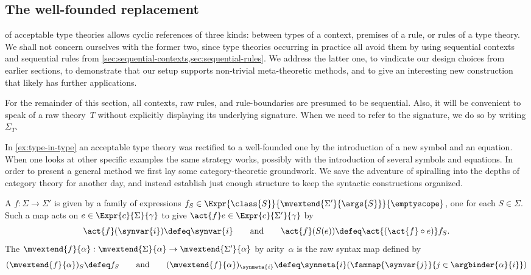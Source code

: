 
\subsection{The well-founded replacement}
\label{sec:well-founded-replacement}

 of acceptable type theories allows cyclic references of three kinds: between types of a context, premises of a rule, or rules of a type theory.
%
We shall not concern ourselves with the former two, since type theories occurring in practice all avoid them by using sequential contexts and sequential rules from \cref{sec:sequential-contexts,sec:sequential-rules}. We address the latter one, to
vindicate our design choices from earlier sections, to demonstrate that our setup supports non-trivial meta-theoretic methods, and to give an interesting new construction that likely has further applications.

For the remainder of this section, all contexts, raw rules, and rule-boundaries are presumed to be sequential. Also, it will be convenient to speak of a raw theory~$T$ without explicitly displaying its underlying signature. When we need to refer to the signature, we do so by writing $\Sigma_T$.

In \cref{ex:type-in-type} an acceptable type theory was rectified to a well-founded one by the introduction of a new symbol and an equation. When one looks at other specific examples the same strategy works, possibly with the introduction of several symbols and equations.
%
In order to present a general method we first lay some category-theoretic groundwork. We save the adventure of spiralling into the depths of category theory for another day, and instead establish just enough structure to keep the syntactic constructions organized.

\begin{definition}
  \label{def:raw-syntax-map}%
  A  $f : \Sigma \to \Sigma'$ is given by a family of expressions
  $f_S \in \Expr{\class{S}}{\mvextend{\Sigma'}{\args{S}}}{\emptyscope}$, one for each
  $S \in \Sigma$.
  Such a map acts on $e \in \Expr{c}{\Sigma}{\gamma}$ to give $\act{f} e \in \Expr{c}{\Sigma'}{\gamma}$ by
  \begin{equation}
    \label{eq:raw-syntax-map}%
    \act{f} (\synvar{i}) \defeq \synvar{i}
    \qquad\text{and}\qquad
    \act{f} (S(e)) \defeq \act{(\act{f} \circ e)} f_S.
  \end{equation}
  The  $\mvextend{f}{\alpha} : \mvextend{\Sigma}{\alpha} \to \mvextend{\Sigma'}{\alpha}$ by arity~$\alpha$ is the raw syntax map defined by
  \begin{equation*}
    (\mvextend{f}{\alpha})_S \defeq f_S
    \qquad\text{and}\qquad
    (\mvextend{f}{\alpha})_{\synmeta{i}} \defeq 
    \synmeta{i}(\fammap{\synvar{j}}{j \in \argbinder{\alpha}{i}})
  \end{equation*}
\end{definition}

